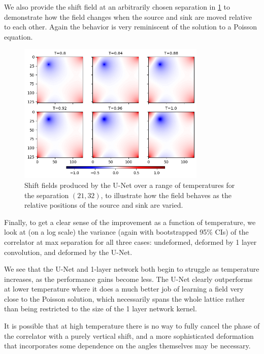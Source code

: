 \documentclass[12pt]{article}
\begin{document}
We also provide the shift field at an arbitrarily chosen separation in \ref{fig:unet_alt_shifts} to demonstrate how the field changes when the source and sink
are moved relative to each other. Again the behavior is very reminiscent of the solution to a Poisson equation.

\begin{figure}
	\centering
	\includegraphics[width=0.8\textwidth]{figures/unet_alt_shifts.png}
	\caption[U-Net Alternate Shifts]{Shift fields produced by the U-Net over a range of temperatures for the separation $(21, 32)$, to illustrate how the field
	behaves as the relative positions of the source and sink are varied.}
	\label{fig:unet_alt_shifts}
\end{figure}

Finally, to get a clear sense of the improvement as a function of temperature, we look at (on a log scale) the
variance (again with bootstrapped 95\% CIs) of the correlator at max separation for all three cases: undeformed, deformed
by 1 layer convolution, and deformed by the U-Net.

We see that the U-Net and 1-layer network both begin to struggle as temperature increases, as the performance gains become less.
The U-Net clearly outperforms at lower temperature where it does a much better job of learning a field very close to the Poisson
solution, which necessarily spans the whole lattice rather than being restricted to the size of the 1 layer network kernel.

It is possible that at high temperature there is no way to fully cancel the phase of the correlator with a purely vertical shift, and a more
sophisticated deformation that incorporates some dependence on the angles themselves may be necessary.  
\end{document}
